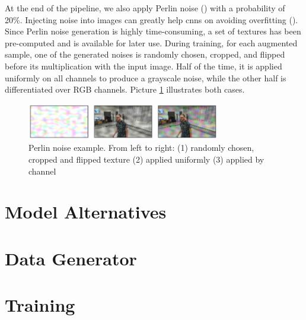 At the end of the pipeline, we also apply Perlin noise (\cite{perlin-noise}) with a probability of 20\%. Injecting noise into images can greatly help \gls{cnn}s on avoiding overfitting (\cite{shorten2019augmentationsurvey}). Since Perlin noise generation is highly time-consuming, a set of textures has been pre-computed and is available for later use. During training, for each augmented sample, one of the generated noises is randomly chosen, cropped, and flipped before its multiplication with the input image. Half of the time, it is applied uniformly on all channels to produce a grayscale noise, while the other half is differentiated over RGB channels. Picture \ref{fig:pelin-noise} illustrates both cases.

\begin{figure}[!h]
	\centering
	\includegraphics[width=0.75\textwidth]{"contents/images/05-imgaug-pelin"}
	\caption[Perlin noise example]{Perlin noise example. From left to right: (1) randomly chosen, cropped and flipped texture (2) applied uniformly (3) applied by channel}
	\label{fig:pelin-noise}
\end{figure}




\section{Model Alternatives}
\label{sec:model-variants}

\lipsum[1]





\section{Data Generator}
\label{sec:implementation-generator}

\lipsum[1]




\section{Training}
\label{sec:implementation-training}

\lipsum[1]

